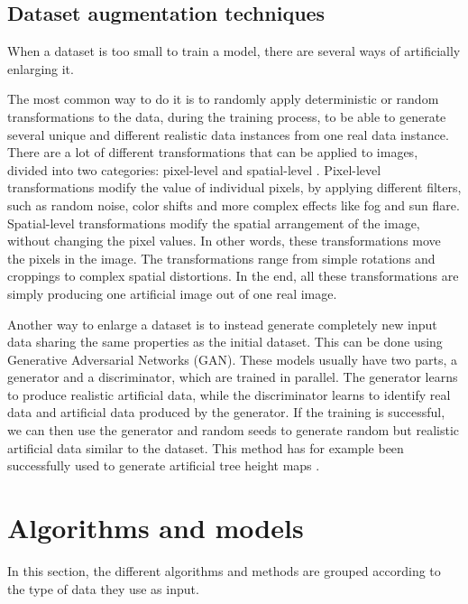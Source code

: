 \documentclass[
]{report}
\begin{document}
\subsection{Dataset augmentation
techniques}\label{sec-sota-dataset-augment}

When a dataset is too small to train a model, there are several ways of
artificially enlarging it.

The most common way to do it is to randomly apply deterministic or
random transformations to the data, during the training process, to be
able to generate several unique and different realistic data instances
from one real data instance. There are a lot of different
transformations that can be applied to images, divided into two
categories: pixel-level and spatial-level \autocite{albumentations}.
Pixel-level transformations modify the value of individual pixels, by
applying different filters, such as random noise, color shifts and more
complex effects like fog and sun flare. Spatial-level transformations
modify the spatial arrangement of the image, without changing the pixel
values. In other words, these transformations move the pixels in the
image. The transformations range from simple rotations and croppings to
complex spatial distortions. In the end, all these transformations are
simply producing one artificial image out of one real image.

Another way to enlarge a dataset is to instead generate completely new
input data sharing the same properties as the initial dataset. This can
be done using Generative Adversarial Networks (GAN). These models
usually have two parts, a generator and a discriminator, which are
trained in parallel. The generator learns to produce realistic
artificial data, while the discriminator learns to identify real data
and artificial data produced by the generator. If the training is
successful, we can then use the generator and random seeds to generate
random but realistic artificial data similar to the dataset. This method
has for example been successfully used to generate artificial tree
height maps \autocite{gan_data_augment}.

\section{Algorithms and models}\label{algorithms-and-models}

In this section, the different algorithms and methods are grouped
according to the type of data they use as input.
\end{document}

